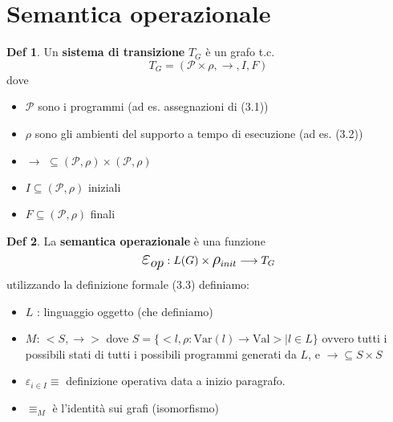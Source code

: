 \documentclass[a4paper]{report}
\newcommand{\prop}{\mathcal{P}}
\theoremstyle{definition} \newtheorem*{defi}{Def}
\theoremstyle{plain} \newtheorem{lemma}{Lemma}
\theoremstyle{plain} \newtheorem{teo}{Teorema}
\theoremstyle{remark} \newtheorem*{es}{Esempio}
\begin{document}
\section{Semantica operazionale}
\begin{defi}
	Un {\bf sistema di transizione} $T_G$ è un grafo t.c.
	$$
	T_G = ( \prop \times \rho , \longrightarrow , I , F  )
	$$
	dove
	\begin{itemize}
		\item $\prop$ sono i programmi (ad es. assegnazioni di (3.1))
		\item $\rho$ sono gli ambienti del supporto a tempo di esecuzione (ad es. (3.2))
		\item $ \longrightarrow \, \, \subseteq ( \prop , \rho ) \times ( \prop , \rho ) $
		\item $ I \subseteq ( \prop,\rho)$ iniziali
		\item $ F \subseteq (\prop, \rho)$ finali
	\end{itemize}
\end{defi}
\begin{defi}
	La {\bf semantica operazionale} è una funzione
	$$
	\mathlarger{\mathlarger{\mathlarger{\varepsilon_{op}}}} : L(G) \times \mathlarger{\mathlarger{\rho}}_{init} \longrightarrow T_G
	$$
	utilizzando la definizione formale (3.3) definiamo:
	\begin{itemize}
		\item $L$ : linguaggio oggetto (che definiamo)
		\item $M$: $<S, \longrightarrow>$ dove $S = \{ <l, \rho : \mathrm{Var}(l)\longrightarrow\mathrm{Val} >| l\in L\}$ ovvero tutti i possibili stati di tutti i possibili programmi generati da $L$, e $\longrightarrow \subseteq S \times S$
		\item $\varepsilon_{i \in I} \equiv $ definizione operativa data a inizio paragrafo.
		\item $\equiv_M$ è l'identità sui grafi (isomorfismo)
	\end{itemize}
\end{defi}
\end{document}
